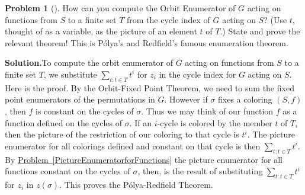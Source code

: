 \documentclass[10pt,]{book}
\theoremstyle{plain}
\theoremstyle{definition}
\newtheorem{activity}[project]{Problem}
\theoremstyle{definition}
\numberwithin{equation}{chapter}
\begin{document}
\begin{activity}[]\label{activity-321}
How can you compute the Orbit Enumerator of \(G\) acting on functions from \(S\) to a finite set \(T\) from the cycle index of \(G\) acting on \(S\)? (Use \(t\), thought of as a variable, as the picture of an element \(t\) of \(T\).) State and prove the relevant theorem! This is Pólya's and Redfield's famous enumeration theorem.%
\par\medskip\noindent%
\textbf{Solution.}\quad To compute the orbit enumerator of \(G\) acting on functions from \(S\) to a finite set \(T\), we substitute \(\sum_{t:t\in T}t^i\) for \(z_i\) in the cycle index for \(G\) acting on \(S\). Here is the proof. By the Orbit-Fixed Point Theorem, we need to sum the fixed point enumerators of the permutations in \(G\). However if \(\sigma\) fixes a coloring \((S,f)\), then \(f\) is constant on the cycles of \(\sigma\). Thus we may think of our function \(f\) as a function defined on the cycles of \(\sigma\). If an \(i\)-cycle is colored by the member \(t\) of \(T\), then the picture of the restriction of our coloring to that cycle is \(t^i\). The picture enumerator for all colorings defined and constant on that cycle is then \(\sum_{t:t\in T} t^i\). By \hyperref[PictureEnumeratorforFunctions]{Problem~\ref{PictureEnumeratorforFunctions}} the picture enumerator for all functions constant on the cycles of \(\sigma\), then, is the result of substituting \(\sum_{t:t\in T}t^i\) for \(z_i\) in \(z(\sigma)\). This proves the Pólya-Redfield Theorem.%
\end{activity}
\end{document}
